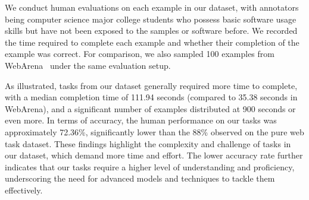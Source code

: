 We conduct human evaluations on each example in our dataset, with annotators being computer science major college students who possess basic software usage skills but have not been exposed to the samples or software before. 
We recorded the time required to complete each example and whether their completion of the example was correct. 
For comparison, we also sampled 100 examples from WebArena~\citep{zhou2023webarena} under the same evaluation setup.

As illustrated, tasks from our dataset generally required more time to complete, with a median completion time of 111.94 seconds (compared to 35.38 seconds in WebArena), and a significant number of examples distributed at 900 seconds or even more. 
In terms of accuracy, the human performance on our tasks was approximately 72.36\%, significantly lower than the 88\% observed on the pure web task dataset.
These findings highlight the complexity and challenge of tasks in our dataset, which demand more time and effort. 
The lower accuracy rate further indicates that our tasks require a higher level of understanding and proficiency, underscoring the need for advanced models and techniques to tackle them effectively.
